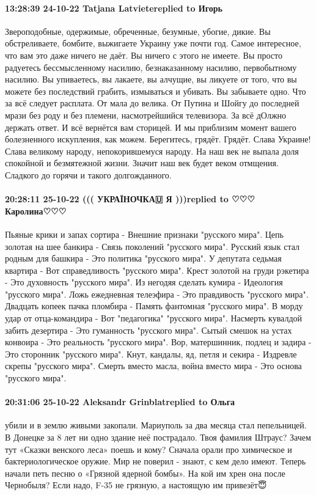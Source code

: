\paragraph{13:28:39 24-10-22 Tatjana Latvietereplied to Игорь}

Звероподобные, одержимые, обреченные, безумные, убогие, дикие.
Вы обстреливаете, бомбите, выжигаете Украину уже почти год.
Самое интересное, что вам это даже ничего не даёт. Вы ничего с этого не имеете.
Вы просто радуетесь бессмысленному насилию, безнаказанному насилию, первобытному насилию.
Вы упиваетесь, вы лакаете, вы алчущие, вы ликуете от того, что вы можете без последствий грабить, измываться и убивать.
Вы забываете одно.
Что за всё следует расплата.
От мала до велика.
От Путина и Шойгу до последней мрази без роду и без племени, насмотрейшийся телевизора.
За всё дОлжно держать ответ.
И всё вернётся вам сторицей.
И мы приблизим момент вашего болезненного искупления, как можем.
Берегитесь, грядёт. Грядёт.
Слава Украине! Слава великому народу, непокорившемуся народу.
На наш век не выпала доля спокойной и безмятежной жизни. Значит наш век будет веком отмщения.
Сладкого до горячи и такого долгожданного.


\paragraph{20:28:11 25-10-22 ((( УКРАЇНОЧКА🇺 Я )))replied to ♡♡♡ Каролина♡♡♡}

Пьяные крики и запах сортира -
Внешние признаки "русского мира".
Цепь золотая на шее банкира -
Связь поколений "русского мира".
Русский язык стал родным для башкира -
Это политика "русского мира".
У депутата седьмая квартира -
Вот справедливость "русского мира".
Крест золотой на груди рэкетира -
Это духовность "русского мира".
Из негодяя сделать кумира -
Идеология "русского мира".
Ложь ежедневная телеэфира -
Это правдивость "русского мира".
Двадцать копеек пачка пломбира -
Память фантомная "русского мира".
В морду удар от отца-командира -
Вот "педагогика" "русского мира".
Насмерть кувалдой забить дезертира -
Это гуманность "русского мира".
Сытый смешок на устах конвоира -
Это реальность "русского мира".
Вор, матершинник, подлец и задира -
Это сторонник "русского мира".
Кнут, кандалы, яд, петля и секира -
Издревле скрепы "русского мира".
Смерть вместо масла, война вместо мира -
Это основа "русского мира".

\paragraph{20:31:06 25-10-22 Aleksandr Grinblatreplied to Ольга}

убили и в землю живыми закопали. Мариуполь за два месяца стал пепельницей. В
Донецке за 8 лет ни одно здание неё пострадало. Твоя фамилия Штраус? Зачем тут
«Сказки венского леса» поешь и кому? Сначала орали про химическое и
бактериологическое оружие. Мир не поверил - знают, с кем дело имеют. Теперь
начали петь песню о «Грязной ядерной бомбы». На кой им хрен она после
Чернобыля? Если надо, F-35 не грязную, а настоящую им привезёт😇

